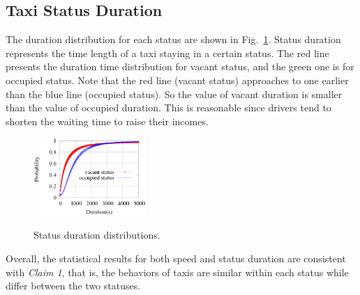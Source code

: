 \subsection{Taxi Status Duration}
The duration distribution for each status are shown in Fig.~\ref{figure_duration_for_each_status}. Status duration represents the time length of a taxi staying in a certain status. The red line presents the duration time distribution for vacant status, and the green one is for occupied status. Note that the red line (vacant status) approaches to  one earlier than the blue line (occupied status). So the value of vacant duration is smaller than the value of occupied duration. This is reasonable since drivers tend to shorten the waiting time to raise their incomes.
\begin{figure}[!h]
\centering
\includegraphics[width=0.38\textwidth]{figures/assumption/durationdis.eps}\\
\caption{Status duration distributions.}\label{figure_duration_for_each_status}
\end{figure}

Overall, the statistical results for both speed and status duration are consistent with \emph{Claim 1}, that is, the behaviors of taxis are similar within each status while differ between the two statuses.
